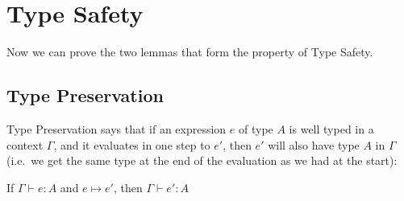 \section{Type Safety}
Now we can prove the two lemmas that form the property of Type Safety.

\subsection{Type Preservation} \label{pres}
Type Preservation says that if an expression $e$ of type $A$ is well typed in a context $\Gamma$, and it evaluates in one step to $e'$, then $e'$ will also have type $A$ in $\Gamma$ (i.e.\ we get the same type at the end of the evaluation as we had at the start):
\vspace{0.5cm}

\begin{thm}
 If $\Gamma \vdash e:A$ and $e \mapsto e'$, then $\Gamma \vdash e' : A$
\end{thm}

